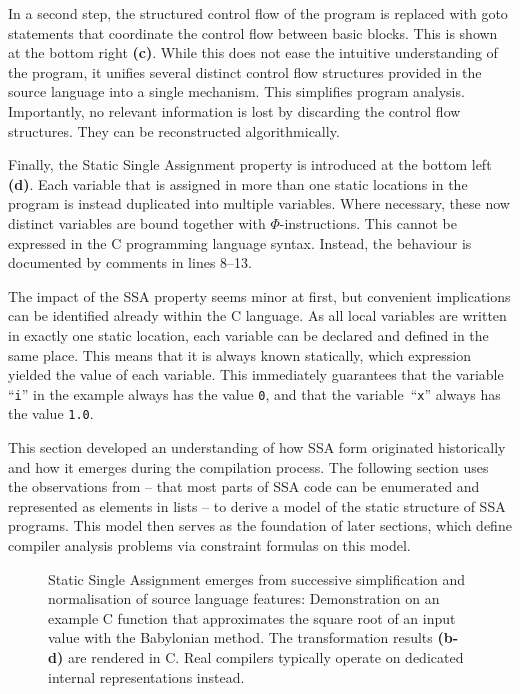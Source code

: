     In a second step, the structured control flow of the program is replaced
    with goto statements that coordinate the control flow between basic blocks.
    This is shown at the bottom right {\bf(c)}.
    While this does not ease the intuitive understanding of the program, it
    unifies several distinct control flow structures provided in the source
    language into a single mechanism.
    This simplifies program analysis.
    Importantly, no relevant information is lost by discarding the control flow
    structures.
    They can be reconstructed algorithmically.

    Finally, the Static Single Assignment property is introduced at the bottom
    left {\bf(d)}.
    Each variable that is assigned in more than one static locations in the
    program is instead duplicated into multiple variables.
    Where necessary, these now distinct variables are bound together with
    $\Phi$-instructions.
    This cannot be expressed in the C programming language syntax.
    Instead, the behaviour is documented by comments in lines 8--13.

    The impact of the SSA property seems minor at first, but convenient
    implications can be identified already within the C language.
    As all local variables are written in exactly one static location, each
    variable can be declared and defined in the same place.
    This means that it is always known statically, which expression yielded the
    value of each variable.
    This immediately guarantees that the variable ``\texttt{i}'' in the example
    always has the value \texttt{0}, and that the variable~``\texttt{x}'' always
    has the value \texttt{1.0}.

    This section developed an understanding of how SSA form originated
    historically and how it emerges during the compilation process.
    The following section uses the observations from
     -- that most parts of SSA code can be enumerated
    and represented as elements in lists -- to derive a model of the static
    structure of SSA programs.
    This model then serves as the foundation of later sections, which define
    compiler analysis problems via constraint formulas on this model.

\begin{figure}[p]
    
    \caption{Static Single Assignment emerges from successive simplification
             and normalisation of source language features: 
             Demonstration on an example C function that approximates the
             square root of an input value with the Babylonian method.
             The transformation results {\bf (b-d)} are rendered in C.
             Real compilers typically operate on
             dedicated internal representations instead.
             \parfillskip=0pt}
    \label{ssaexample}
\end{figure}

